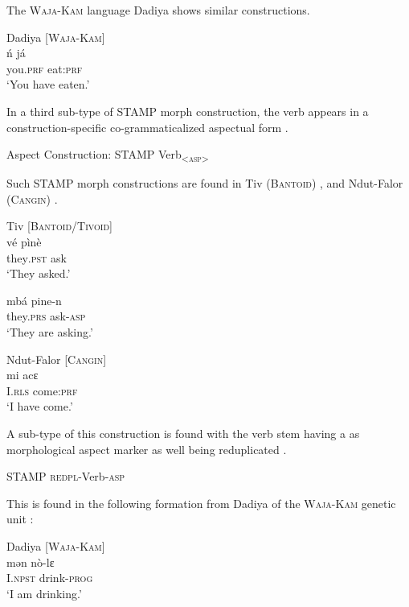 \documentclass[output=paper]{langsci/langscibook}
\begin{document}
The \textsc{Waja-Kam} language Dadiya shows similar constructions.

\ea\label{ex:anderson:15}
Dadiya   \citep[196]{Jungraithmayr1968}       [\textsc{Waja-Kam]}  \\
\gll \'{n}    já    \\
you\textsc{.prf}  eat:\textsc{prf}    \\
\glt `You have eaten.'  
\z

In a third sub-type of STAMP morph construction, the verb appears in a construction-specific co-grammaticalized aspectual form . 

\ea\label{ex:anderson:16}
Aspect Construction:    STAMP  Verb\textsubscript{<\textsc{asp}>}    
\z

Such STAMP morph constructions are found in Tiv (\textsc{Bantoid}) , and Ndut-Falor (\textsc{Cangin}) .

\ea\label{ex:anderson:17}
\ea\label{ex:anderson:17a}
Tiv \citep[114]{Arnott1958}          \textsc{[Bantoid/Tivoid]}\\
\gll vé     pìnè        \\
  they\textsc{.pst}   ask          \textsc{}\\
\glt `They asked.'          

\ex \label{ex:anderson:17b}
\gll mbá       pi\textsuperscript{{\textbar}}ne-n  \\
  they.\textsc{prs}    ask-\textsc{asp}\\
\glt `They are asking.'      
\z
\z

\ea\label{ex:anderson:18}
Ndut-Falor \citep[Ndut-Falor 4]{Pichl1973}      [\textsc{Cangin}]\\
\gll mi    acɛ          \\
I.\textsc{rls}  come:\textsc{prf}\\
\glt `I have come.'  
\z

A sub-type of this construction is found with the verb stem having a as morphological aspect marker as well being reduplicated . 

\ea\label{ex:anderson:19}
   STAMP  \textsc{redpl}-Verb-\textsc{asp} 
\z

This is found in the following formation from Dadiya of the \textsc{Waja-Kam} genetic unit :

\ea\label{ex:anderson:20}
Dadiya   \citep[197]{Jungraithmayr1968}        [\textsc{Waja-Kam}]\\
\ea\label{ex:anderson:20a}
\gll mən  nò-lɛ\\
  I.\textsc{npst}  drink-\textsc{prog}        \\
\glt `I am drinking.'         
\end{document}
